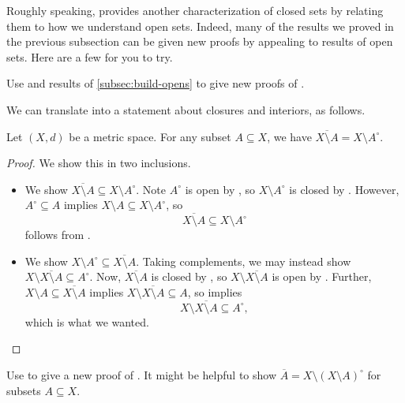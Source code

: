 \documentclass[../main.tex]{subfiles}
\begin{document}
Roughly speaking,  provides another characterization of closed sets by relating them to how we understand open sets. Indeed, many of the results we proved in the previous subsection can be given new proofs by appealing to results of open sets. Here are a few for you to try.
\begin{exe} \label{exe:complement-open-is-closed}
    Use  and results of \cref{subsec:build-opens} to give new proofs of .
\end{exe}
We can translate  into a statement about closures and interiors, as follows.
\begin{corollary} \label{cor:complement-int-is-cl}
    Let $(X,d)$ be a metric space. For any subset $A\subseteq X$, we have $\overline{X\setminus A}=X\setminus A^\circ$.
\end{corollary}
\begin{proof}
    We show this in two inclusions.
    \begin{itemize}
        \item We show $\overline{X\setminus A}\subseteq X\setminus A^\circ$. Note $A^\circ$ is open by , so $X\setminus A^\circ$ is closed by . However, $A^\circ\subseteq A$ implies $X\setminus A\subseteq X\setminus A^\circ$, so
        \[\overline{X\setminus A}\subseteq X\setminus A^\circ\]
        follows from .
        \item We show $X\setminus A^\circ\subseteq\overline{X\setminus A}$. Taking complements, we may instead show $X\setminus\overline{X\setminus A}\subseteq A^\circ$. Now, $\overline{X\setminus A}$ is closed by , so $X\setminus\overline{X\setminus A}$ is open by . Further, $X\setminus A\subseteq\overline{X\setminus A}$ implies $X\setminus\overline{X\setminus A}\subseteq A$, so  implies
        \[X\setminus\overline{X\setminus A}\subseteq A^\circ,\]
        which is what we wanted.
        \qedhere
    \end{itemize}
\end{proof}
\begin{exe}
    Use  to give a new proof of . It might be helpful to show $\overline A=X\setminus(X\setminus A)^\circ$ for subsets $A\subseteq X$.
\end{exe}
\end{document}
